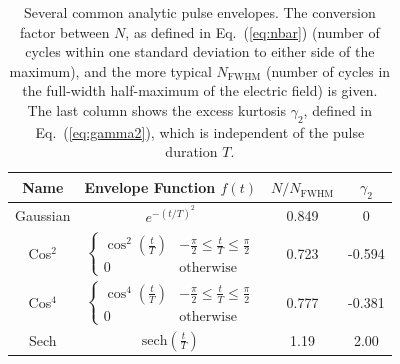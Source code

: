\begin{table}
\begin{center}
 \begin{tabular}{||c | c | c | c||} 
 \hline
 Name & Envelope Function $f(t)$ & $ N/N_{\text{FWHM}}$ & $\gamma_2$ \\ [0.5ex] 
 \hline\hline
 Gaussian & $e^{-(t/T)^2}$ & 0.849 & 0 \\ 
 \hline
 Cos$^2$ & $\begin{cases} 
      \cos^2\left(\frac{t}{T}\right) & -\frac{\pi}{2} \leq \frac{t}{T} \leq \frac{\pi}{2} \\
      0 & \text{otherwise}
    \end{cases}$ & 0.723 & -0.594 \\
 \hline
  Cos$^4$ &  $\begin{cases} 
        \cos^4\left(\frac{t}{T}\right) & -\frac{\pi}{2} \leq \frac{t}{T} \leq \frac{\pi}{2} \\
        0 & \text{otherwise}
    \end{cases}$ & 0.777 & -0.381 \\
 \hline
 Sech & $\text{sech}(\frac{t}{T})$ & 1.19 & 2.00 \\
 \hline
\end{tabular}
\end{center}
 \caption{Several common analytic pulse envelopes. The conversion factor between $N$, as defined in Eq.~(\ref{eq:nbar}) (number of cycles within one standard deviation to either side of the maximum), and the more typical $N_{\text{FWHM}}$ (number of cycles in the full-width half-maximum of the electric field) is given. The last column shows the excess kurtosis $\gamma_2$, defined in Eq.~(\ref{eq:gamma2}), which is independent of the pulse duration $T$.}
 \label{tab:envelopes}
\end{table}

